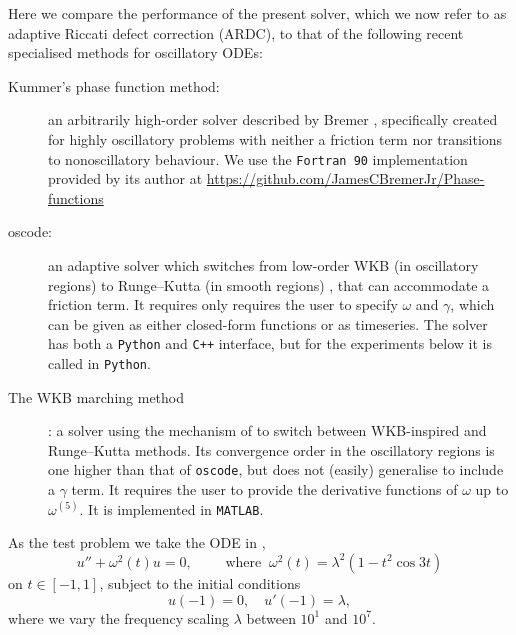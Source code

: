 \documentclass[10pt]{article}
\newcommand{\be}{\begin{equation}}
\newcommand{\ee}{\end{equation}}
\newcommand{\om}{\omega}
\newcommand{\g}{\gamma}
\begin{document}
Here we compare the performance of the present solver, which
we now refer to as adaptive Riccati defect correction (ARDC), to that of the
following recent specialised methods for oscillatory ODEs:
\begin{description}
\item[Kummer's phase function method:]{ an arbitrarily high-order solver
        described by Bremer \cite{bremer2018}, specifically created for highly
        oscillatory problems with neither a friction term nor
        transitions to nonoscillatory behaviour.
        We use the \texttt{Fortran 90} implementation provided by its author
        at
        \url{https://github.com/JamesCBremerJr/Phase-functions}
        }
\item[oscode:]   %
{an adaptive solver which switches from low-order WKB (in oscillatory regions) to Runge--Kutta (in smooth regions)
        \cite{agocs2020efficient,agocs2020dense}, that can accommodate a
        friction term. It requires
        only requires the user to specify $\om$ and $\g$, which can be given as
        either closed-form functions or as timeseries. The solver has both a
        \texttt{Python} and \texttt{C++} interface, but for the experiments below it is called in
        \texttt{Python}.}
\item[The WKB marching method] {\cite{arnold2011wkb,korner2022wkb}:
  a solver using
        the mechanism of \cite{agocs2020efficient} to switch between
        WKB-inspired and Runge--Kutta
        methods. Its convergence order in the oscillatory regions is one higher
        than that of \texttt{oscode}, but does not (easily) generalise to
        include a $\g$ term. It requires the user to provide
        the derivative functions of $\om$ up to $\om^{(5)}$.
        It is implemented in \texttt{MATLAB}.
    }
\end{description}

As the test problem we take the ODE in \cite[Eq.~(237)]{bremer2018},
\be\label{bremer237eq}
u'' + \om^2(t) u = 0, \qquad \mbox{ where} \;\; \om^2(t) = \lambda^2(1 - t^2\cos3t)
\ee
on $t \in [-1, 1]$, subject to the initial conditions
\be\label{bremer237ic}
u(-1) = 0, \quad u'(-1) = \lambda,
\ee
where we vary the frequency scaling $\lambda$ between $10^1$ and $10^7$.
\end{document}
